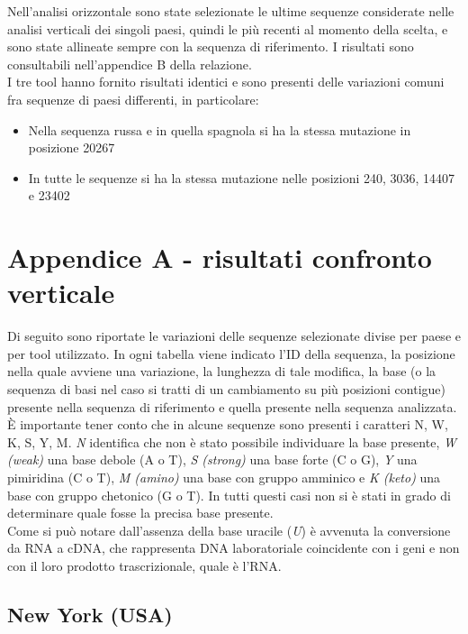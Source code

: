 \documentclass[a4paper,10pt]{article}
\begin{document}
Nell'analisi orizzontale sono state selezionate le ultime sequenze considerate nelle analisi verticali dei singoli paesi, quindi le più recenti al momento della scelta, e sono state allineate sempre con la sequenza di riferimento. I risultati sono consultabili nell'appendice B della relazione.\\
I tre tool hanno fornito risultati identici e sono presenti delle variazioni comuni fra sequenze di paesi differenti, in particolare:
\begin{itemize}
\item Nella sequenza russa e in quella spagnola si ha la stessa mutazione in posizione 20267
\item In tutte le sequenze si ha la stessa mutazione nelle posizioni 240, 3036, 14407 e 23402
\end{itemize}


\newpage

\section{Appendice A - risultati confronto verticale}
Di seguito sono riportate le variazioni delle sequenze selezionate divise per paese e per tool utilizzato. In ogni tabella viene indicato l'ID della sequenza, la posizione nella quale avviene una variazione, la lunghezza di tale modifica, la base (o la sequenza di basi nel caso si tratti di un cambiamento su più posizioni contigue) presente nella sequenza di riferimento e quella presente nella sequenza analizzata. \\
È importante tener conto che in alcune sequenze sono presenti i caratteri {N, W, K, S, Y, M}. \textit{N} identifica che non è stato possibile individuare la base presente, \textit{W (weak)} una base debole (A o T), \textit{S (strong)} una base forte (C o G), \textit{Y} una pimiridina (C o T), \textit{M (amino)} una base con gruppo amminico e \textit{K (keto)} una base con gruppo chetonico (G o T). In tutti questi casi non si è stati in grado di determinare quale fosse la precisa base presente. \\
Come si può notare dall'assenza della base uracile (\textit{U}) è avvenuta la conversione da RNA a cDNA, che rappresenta DNA laboratoriale coincidente con i geni e non con il loro prodotto trascrizionale, quale è l'RNA.

\subsection{New York (USA)}
\end{document}
